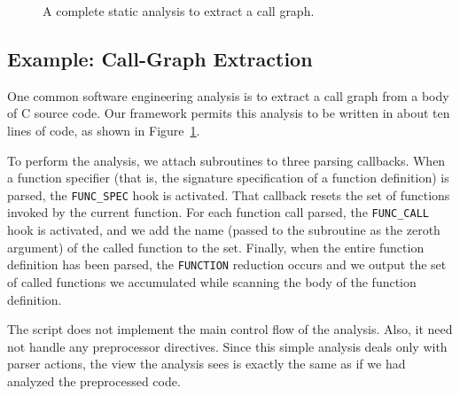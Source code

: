 \documentclass{article}
\newcommand{\C}{\mbox{C}}
\begin{document}
\begin{figure}[t]
\begin{center}
\begin{small}
\end{small}
\caption{A complete static analysis to extract a call graph.}
\label{fig:call_graph_extractor}
\end{center}
\end{figure}

\subsection{Example: Call-Graph Extraction}
\label{sec:call_graph_extraction}


One common software engineering analysis is to extract a call graph from a
body of \C{} source code.  Our framework permits this analysis to be
written in about ten lines of code, as shown in
Figure~\ref{fig:call_graph_extractor}.

To perform the analysis, we attach subroutines to three parsing
callbacks.  When a function specifier (that is, 
the signature specification of a
function definition) is parsed, the \texttt{FUNC\_SPEC} hook is
activated.  That callback resets the set of functions invoked by
the current function.  For each function call parsed, the
\texttt{FUNC\_CALL} hook is activated, and we add the name (passed to
the subroutine as the zeroth argument) of the called function to the
set.  Finally, when the entire function definition has been parsed, the
\texttt{FUNCTION} reduction occurs and we output the set of called
functions we accumulated while scanning the body of the function
definition.

The script does not implement the main control flow of the
analysis.  Also, it need not handle any preprocessor directives.  Since
this simple analysis deals only with parser actions, the view the
analysis sees is exactly the same as if we had analyzed the preprocessed 
code.
\end{document}
